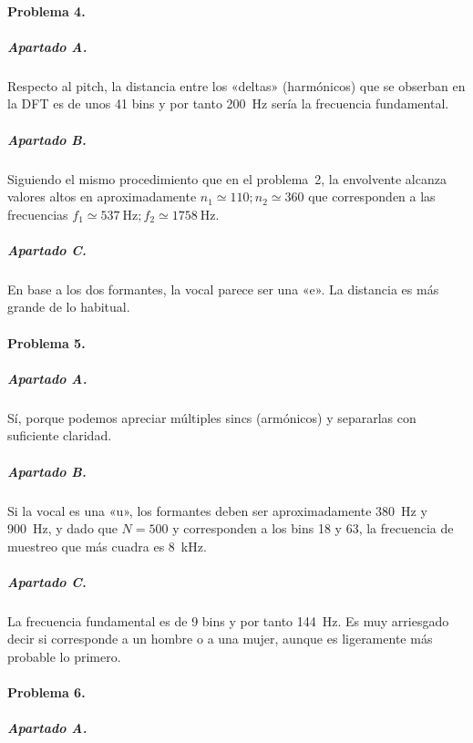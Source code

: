 \finishpage


\startpage
\paragraph{Problema 4.}

\subparagraph{Apartado A.}

Respecto al pitch, la distancia entre los «deltas» (harmónicos) que se obserban
en la DFT es de unos \num{41} bins y por tanto \SI{200}{\hertz} sería la
frecuencia fundamental.

\subparagraph{Apartado B.}

Siguiendo el mismo procedimiento que en el problema~2, la envolvente alcanza
valores altos en aproximadamente $n_1 \simeq \num{110}; n_2 \simeq \num{360}$
que corresponden a las frecuencias $f_1 \simeq \SI{537}{\hertz}; f_2 \simeq
\SI{1758}{\hertz}$.

\subparagraph{Apartado C.}

En base a los dos formantes, la vocal parece ser una «e». La distancia es más
grande de lo habitual.

\finishpage


\startpage
\paragraph{Problema 5.}

\subparagraph{Apartado A.}

Sí, porque podemos apreciar múltiples sincs (armónicos) y separarlas con
suficiente claridad.

\subparagraph{Apartado B.}

Si la vocal es una «u», los formantes deben ser aproximadamente \SI{380}{\hertz}
y \SI{900}{\hertz}, y dado que $N = 500$ y corresponden a los bins \num{18} y
\num{63}, la frecuencia de muestreo que más cuadra es \SI{8}{\kilo\hertz}.

\subparagraph{Apartado C.}

La frecuencia fundamental es de 9 bins y por tanto \SI{144}{\hertz}.
Es muy arriesgado decir si corresponde a un hombre o a una mujer, aunque
es ligeramente más probable lo primero.

\finishpage


\startpage
\paragraph{Problema 6.}

\subparagraph{Apartado A.}

